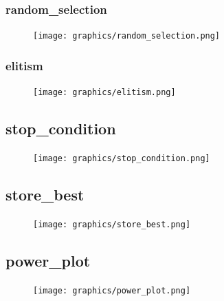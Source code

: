 \documentclass{article}
\begin{document}
        \subsubsection{random\_selection}
        \begin{figure}[h!]
            \begin{center}
                \texttt{[image: graphics/random\_selection.png]}
            \end{center}                
        \end{figure}   
        \newpage
        \subsubsection{elitism}
        \begin{figure}[h!]
            \begin{center}
                \texttt{[image: graphics/elitism.png]}
            \end{center}                
        \end{figure}   
    \newpage
    \subsection{stop\_condition}
    \begin{figure}[h!]
        \begin{center}
            \texttt{[image: graphics/stop\_condition.png]}
        \end{center}                
    \end{figure}   
    \subsection{store\_best}
    \begin{figure}[h!]
        \begin{center}
            \texttt{[image: graphics/store\_best.png]}
        \end{center}                
    \end{figure}  
    \newpage 
    \subsection{power\_plot}
    \begin{figure}[h!]
        \begin{center}
            \texttt{[image: graphics/power\_plot.png]}
        \end{center}                
    \end{figure}   
\end{document}
